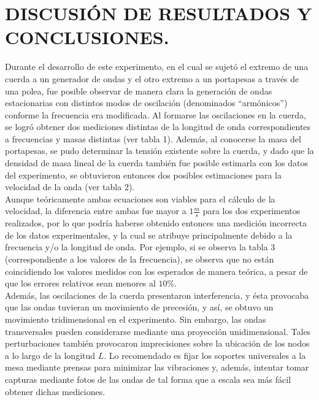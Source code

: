 \documentclass[10pt,a4paper]{article}
\begin{document}
\newpage

\section{DISCUSIÓN DE RESULTADOS Y CONCLUSIONES.} %
Durante el desarrollo de este experimento, en el cual se sujetó el extremo de una cuerda a un generador de ondas y el otro extremo a un portapesas a través de una polea, fue posible observar de manera clara la generación de ondas estacionarias con distintos modos de oscilación (denominados “armónicos”) conforme la frecuencia era modificada.
Al formarse las oscilaciones en la cuerda, se logró obtener dos mediciones distintas de la longitud de onda correspondientes a frecuencias y masas distintas (ver tabla 1).
Además, al conocerse la masa del portapesas, se pudo determinar la tensión existente sobre la cuerda, y dado que la densidad de masa lineal de la cuerda también fue posible estimarla con los datos del experimento, se obtuvieron entonces dos posibles estimaciones para la velocidad de la onda (ver tabla 2).  \\[2mm]

Aunque teóricamente ambas ecuaciones son viables para el cálculo de la velocidad, la diferencia entre ambas fue mayor a $1 \frac{m}{s}$  para los dos experimentos realizados, por lo que podría haberse obtenido entonces una medición incorrecta de los datos experimentales, y la cual se atribuye principalmente debido a la frecuencia y/o la longitud de onda.
Por ejemplo, si se observa la tabla 3 (correspondiente a los valores de la frecuencia), se observa que no están coincidiendo los valores medidos con los esperados de manera teórica, a pesar de que los errores relativos sean menores al $10$\textsc{\%}. \\[2mm]

Además, las oscilaciones de la cuerda presentaron interferencia, y ésta provocaba que las ondas tuvieran un movimiento de precesión, y así, se obtuvo un movimiento tridimensional en el experimento.
Sin embargo, las ondas transversales pueden considerarse mediante una proyección unidimensional.
Tales perturbaciones también provocaron imprecisiones sobre la ubicación de los nodos a lo largo de la longitud $L$.
Lo recomendado es fijar los soportes universales a la mesa mediante prensas para minimizar las vibraciones y, además, intentar tomar capturas mediante fotos de las ondas de tal forma que a escala sea más fácil obtener dichas mediciones. \\[2mm]
\end{document}
